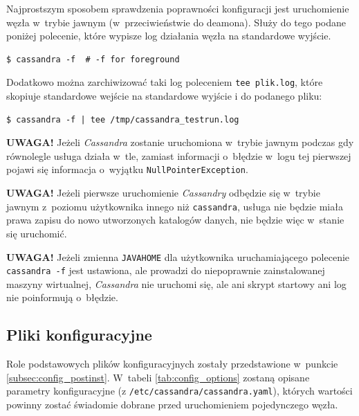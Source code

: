 \documentclass{article} %
\begin{document}
Najprostszym sposobem sprawdzenia poprawności konfiguracji jest uruchomienie węzła w~trybie jawnym (w~przeciwieństwie do deamona).
Służy do tego podane poniżej polecenie, które wypisze log działania węzła na standardowe wyjście.

\begin{lstlisting}[style=bash, caption={testowe uruchamianie \emph{Cassandry}}]
$ cassandra -f  # -f for foreground
\end{lstlisting}

Dodatkowo można zarchiwizować taki log poleceniem \texttt{tee plik.log}, które skopiuje standardowe wejście na standardowe wyjście i do podanego pliku:

\begin{lstlisting}[style=bash, caption={testowe uruchamianie \emph{Cassandry} z archiwizacją logu}]
$ cassandra -f | tee /tmp/cassandra_testrun.log
\end{lstlisting}

\bigskip

\noindent\textbf{UWAGA!} Jeżeli \emph{Cassandra} zostanie uruchomiona w~trybie jawnym podczas gdy równolegle usługa działa w~tle, zamiast informacji o~błędzie w~logu tej pierwszej pojawi się informacja o~wyjątku \texttt{NullPointerException}.

\bigskip

\noindent\textbf{UWAGA!} Jeżeli pierwsze uruchomienie \emph{Cassandry} odbędzie się w~trybie jawnym z~poziomu użytkownika innego niż \texttt{cassandra}, usługa nie będzie miała prawa zapisu do nowo utworzonych katalogów danych, nie będzie więc w~stanie się uruchomić.

\bigskip

\noindent\textbf{UWAGA!} Jeżeli zmienna \texttt{JAVA\textunderscore HOME} dla użytkownika uruchamiającego polecenie \texttt{cassandra~-f} jest ustawiona, ale prowadzi do niepoprawnie zainstalowanej maszyny wirtualnej, \emph{Cassandra} nie uruchomi się, ale ani skrypt startowy ani log nie poinformują o~błędzie.

\subsection{Pliki konfiguracyjne}\label{subsec:config_files}

Role podstawowych plików konfiguracyjnych zostały przedstawione w~punkcie \ref{subsec:config_postinst}.
W~tabeli \ref{tab:config_options} zostaną opisane parametry konfiguracyjne (z \texttt{/etc/cassandra/cassandra.yaml}), których wartości powinny zostać świadomie dobrane przed uruchomieniem pojedynczego węzła.
\end{document}
